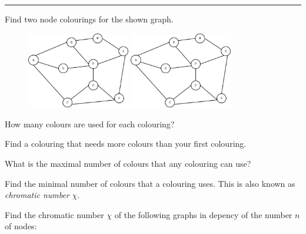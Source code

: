 

\usepackage{pstricks,pst-node,pst-tree}
\usepackage{graphicx}




  \sheet[%
  number=2,
      topic={Graphs },
    ]

\vspace{-1cm}
\noindent\rule{12cm}{0.4pt}

  \exercise[%
  topic = Node colouring 
    ]

%



 \subexercise[%
  topic=Colouring a Graph,
    ]

Find two node colourings for the shown graph.

\begin{figure}[h]
\includegraphics[width=0.4\textwidth]{graph_colouring.eps}
\includegraphics[width=0.4\textwidth]{graph_colouring.eps}
\end{figure}

How many colours are used for each colouring?

Find a colouring that needs more colours than your first colouring.

What is the maximal number of colours that any colouring can use?

Find the minimal number of colours that a colouring uses. This is also known as \emph{chromatic number} $\chi$.

\subexercise[%
  topic=Chromatic Number of Graph Models,
    ]
		\label{subseq:graphen}
		
Find the chromatic number $\chi$ of the following graphs in depency of the number $n$ of nodes:

